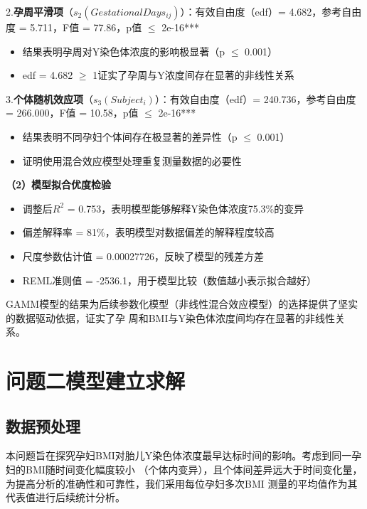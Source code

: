\documentclass{article}
\begin{document}
2.\textbf{孕周平滑项}（$s_2(GestationalDays_{ij})$）：有效自由度（edf）= 4.682，参考自由度 = 5.711，F值 = 77.86，p值 $\leq$ 2e-16***
\begin{itemize}
    \item 结果表明孕周对Y染色体浓度的影响极显著（p $\leq$ 0.001）
    \item edf = 4.682 $\geq$ 1证实了孕周与Y浓度间存在显著的非线性关系
\end{itemize}

3.\textbf{个体随机效应项}（$s_3(Subject_i)$）：有效自由度（edf）= 240.736，参考自由度 = 266.000，F值 = 10.58，p值 $\leq$ 2e-16***
\begin{itemize}
    \item 结果表明不同孕妇个体间存在极显著的差异性（p $\leq$ 0.001）
    \item 证明使用混合效应模型处理重复测量数据的必要性
\end{itemize}

\textbf{（2）模型拟合优度检验}
\begin{itemize}
    \item 调整后$R^2$ = 0.753，表明模型能够解释Y染色体浓度75.3\%的变异
    \item 偏差解释率 = 81\%，表明模型对数据偏差的解释程度较高
    \item 尺度参数估计值 = 0.00027726，反映了模型的残差方差
    \item REML准则值 = -2536.1，用于模型比较（数值越小表示拟合越好）
\end{itemize}

GAMM模型的结果为后续参数化模型（非线性混合效应模型）的选择提供了坚实的数据驱动依据，证实了孕
周和BMI与Y染色体浓度间均存在显著的非线性关系。
\section{\textbf{问题二模型建立求解}}
\subsection{\textbf{数据预处理}}
本问题旨在探究孕妇BMI对胎儿Y染色体浓度最早达标时间的影响。考虑到同一孕妇的BMI随时间变化幅度较小
（个体内变异），且个体间差异远大于时间变化量，为提高分析的准确性和可靠性，我们采用每位孕妇多次BMI
测量的平均值作为其代表值进行后续统计分析。
\end{document}
